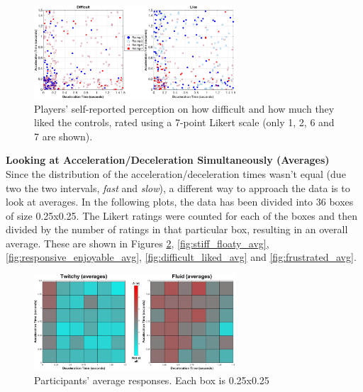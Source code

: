 \begin{figure}[htbp]
\centering
\includegraphics[width=0.67\textwidth]{Pics/Classes/difficult_like}
\caption{Players' self-reported perception on how difficult and how much they liked the controls, rated using a 7-point Likert scale (only 1, 2, 6 and 7 are shown).}
\label{fig:difficult_liked}
\end{figure}


\textbf{Looking at Acceleration/Deceleration Simultaneously (Averages)}\\
Since the distribution of the acceleration/deceleration times wasn't equal (due two the two intervals, \textit{fast} and \textit{slow}), a different way to approach the data is to look at averages. In the following plots, the data has been divided into 36 boxes of size 0.25x0.25. The Likert ratings were counted for each of the boxes and then divided by the number of ratings in that particular box, resulting in an overall average. These are shown in Figures \ref{fig:twitchyFluid_avg}, \ref{fig:stiff_floaty_avg}, \ref{fig:responsive_enjoyable_avg}, \ref{fig:difficult_liked_avg} and \ref{fig:frustrated_avg}.

\begin{figure}[htbp]
\centering
\includegraphics[width=0.67\textwidth]{Pics/Classes/averages/twitchy_fluid_avg}
\caption{Participants' average responses. Each box is 0.25x0.25}
\label{fig:twitchyFluid_avg}
\end{figure}

